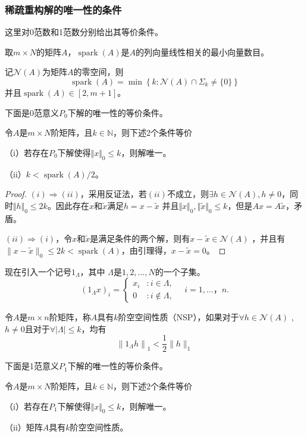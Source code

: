 \subsubsection{稀疏重构解的唯一性的条件}
这里对0范数和1范数分别给出其等价条件。
\begin{definition}
    取$m\times N$的矩阵$A$，$ \operatorname{spark}(A)$是$A$的列向量线性相关的最小向量数目。
\end{definition}
\begin{lemma}
    记$\mathcal{N}(A)$为矩阵$A$的零空间，则
   \begin{equation}
    \operatorname{spark}(A)=\min \left\{k: \mathcal{N}(A) \cap \Sigma_k \neq\{0\}\right\}
   \end{equation}
   并且$\operatorname{spark}(A) \in[2,m+1]$。
\end{lemma}
下面是0范意义$P_0$下解的唯一性的等价条件。
\begin{theorem}
    令$A$是$m\times N$阶矩阵，且$k \in \mathbb{N}$，则下述2个条件等价\par
    （i）若存在$P_0$下解使得$\Vert x \Vert_0 \le k$，则解唯一。\par
    （ii）$k<\operatorname{spark}(A)/2 $。
\end{theorem}
\begin{proof}
    $(i)\Rightarrow (ii)$，采用反证法，若$(ii)$不成立，则$\exists h \in \mathcal{N}(A)
    ,h\neq 0$，同时$\Vert h \Vert_0 \le 2k$。因此存在$x$和$\tilde{x}$满足$h=x-\tilde{x}$
    并且$\Vert x \Vert_0 ,\Vert \tilde{x} \Vert_0 \le k$，但是$Ax=A\tilde{x}$，矛盾。\par
    $(ii)\Rightarrow (i)$，令$x$和$\tilde{x}$是满足条件的两个解，则有$x-\tilde{x}\in \mathcal{N}(A)$
    ，并且有$\|x-\tilde{x}\|_0 \leq 2 k<\operatorname{spark}(A)$，由引理得，$x-\tilde{x}=0$。
\end{proof}
现在引入一个记号$1_{\Lambda}$，其中 $\Lambda$是${1,2,\ldots,N}$的一个子集。
\begin{equation}
    \left(1_{\Lambda} x\right)_i=\left\{ \begin{array}{rl}
    x_i & : i \in \Lambda,\\
    0 & : i \notin \Lambda,
    \end{array} \quad i=1,\ldots，n .\right .
\end{equation}
\begin{definition}
    令$A$是$m\times n$阶矩阵，称$A$具有$k$阶空空间性质（NSP），如果对于$\forall h \in \mathcal{N}(A)$
    ,$h \neq 0$且对于$\forall |\Lambda| \leq k$，均有
    \begin{equation}
        \left\|1_{\Lambda} h\right\|_1<\frac{1}{2}\|h\|_1
    \end{equation}
\end{definition}
下面是1范意义$P_1$下解的唯一性的等价条件。
\begin{theorem}
    令$A$是$m\times N$阶矩阵，且$k \in \mathbb{N}$，则下述2个条件等价\par
    （i）若存在$P_1$下解使得$\Vert x \Vert_0 \le k$，则解唯一。\par
    （ii）矩阵$A$具有$k$阶空空间性质。
\end{theorem}

